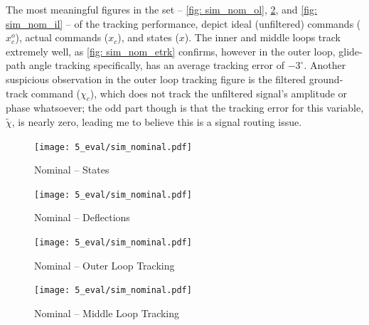 \documentclass[12pt]{ucthesis}
\begin{document}
The most meaningful figures in the set -- \ref{fig: sim_nom_ol}, \ref{fig: sim_nom_ml}, and \ref{fig: sim_nom_il} -- of the tracking performance, depict ideal (unfiltered) commands ($x^o_c$), actual commands ($x_c$), and states ($x$). The inner and middle loops track extremely well, as \autoref{fig: sim_nom_etrk} confirms, however in the outer loop, glide-path angle tracking specifically, has an average tracking error of $-3^{\circ}$. Another suspicious observation in the outer loop tracking figure is the filtered ground-track command ($\chi_c$), which does not track the unfiltered signal's amplitude or phase whatsoever; the odd part though is that the tracking error for this variable, $\tilde{\chi}$, is nearly zero, leading me to believe this is a signal routing issue.
%
\begin{figure}
	\begin{minipage}[b]{0.5\textheight}%
		\begin{flushright}%
	\texttt{[image: 5\_eval/sim\_nominal.pdf]}%
	\caption{Nominal -- States}
	\label{fig: sim_nom_x}
		\end{flushright}%
	\end{minipage}%
	\hspace{0.5cm}%
	\begin{minipage}[b]{0.5\textheight}%
		\begin{flushleft}%
	\texttt{[image: 5\_eval/sim\_nominal.pdf]}%
	\caption{Nominal -- Deflections}
	\label{fig: sim_nom_defl}
		\end{flushleft}%
	\end{minipage}%
\end{figure}
%
\begin{figure}
	\begin{minipage}[b]{0.5\textheight}%
	\centering
		\begin{flushright}%
			\centering
			\texttt{[image: 5\_eval/sim\_nominal.pdf]}%
			\caption{Nominal -- Outer Loop Tracking}
			\label{fig: sim_nom_ol}
		\end{flushright}%
	\end{minipage}%
	\hspace{0.5cm}%
	\begin{minipage}[b]{0.5\textheight}%
		\begin{flushleft}%
			\centering
			\texttt{[image: 5\_eval/sim\_nominal.pdf]}%
			\caption{Nominal -- Middle Loop Tracking}
			\label{fig: sim_nom_ml}
		\end{flushleft}%
	\end{minipage}%
\end{figure}
\end{document}
